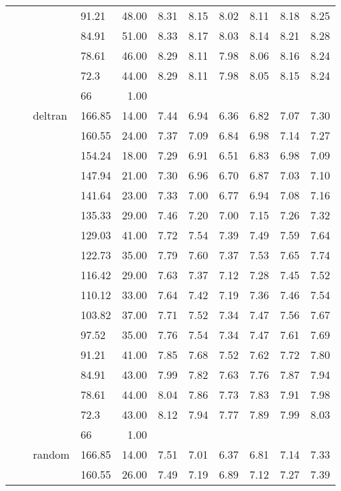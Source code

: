 \begin{longtable}{llllrrrrrrr}
   &  &  & 91.21 & 48.00 & 8.31 & 8.15 & 8.02 & 8.11 & 8.18 & 8.25 \\ 
   &  &  & 84.91 & 51.00 & 8.33 & 8.17 & 8.03 & 8.14 & 8.21 & 8.28 \\ 
   &  &  & 78.61 & 46.00 & 8.29 & 8.11 & 7.98 & 8.06 & 8.16 & 8.24 \\ 
   &  &  & 72.3 & 44.00 & 8.29 & 8.11 & 7.98 & 8.05 & 8.15 & 8.24 \\ 
   &  &  & 66 & 1.00 &  &  &  &  &  &  \\ 
   &  & deltran & 166.85 & 14.00 & 7.44 & 6.94 & 6.36 & 6.82 & 7.07 & 7.30 \\ 
   &  &  & 160.55 & 24.00 & 7.37 & 7.09 & 6.84 & 6.98 & 7.14 & 7.27 \\ 
   &  &  & 154.24 & 18.00 & 7.29 & 6.91 & 6.51 & 6.83 & 6.98 & 7.09 \\ 
   &  &  & 147.94 & 21.00 & 7.30 & 6.96 & 6.70 & 6.87 & 7.03 & 7.10 \\ 
   &  &  & 141.64 & 23.00 & 7.33 & 7.00 & 6.77 & 6.94 & 7.08 & 7.16 \\ 
   &  &  & 135.33 & 29.00 & 7.46 & 7.20 & 7.00 & 7.15 & 7.26 & 7.32 \\ 
   &  &  & 129.03 & 41.00 & 7.72 & 7.54 & 7.39 & 7.49 & 7.59 & 7.64 \\ 
   &  &  & 122.73 & 35.00 & 7.79 & 7.60 & 7.37 & 7.53 & 7.65 & 7.74 \\ 
   &  &  & 116.42 & 29.00 & 7.63 & 7.37 & 7.12 & 7.28 & 7.45 & 7.52 \\ 
   &  &  & 110.12 & 33.00 & 7.64 & 7.42 & 7.19 & 7.36 & 7.46 & 7.54 \\ 
   &  &  & 103.82 & 37.00 & 7.71 & 7.52 & 7.34 & 7.47 & 7.56 & 7.67 \\ 
   &  &  & 97.52 & 35.00 & 7.76 & 7.54 & 7.34 & 7.47 & 7.61 & 7.69 \\ 
   &  &  & 91.21 & 41.00 & 7.85 & 7.68 & 7.52 & 7.62 & 7.72 & 7.80 \\ 
   &  &  & 84.91 & 43.00 & 7.99 & 7.82 & 7.63 & 7.76 & 7.87 & 7.94 \\ 
   &  &  & 78.61 & 44.00 & 8.04 & 7.86 & 7.73 & 7.83 & 7.91 & 7.98 \\ 
   &  &  & 72.3 & 43.00 & 8.12 & 7.94 & 7.77 & 7.89 & 7.99 & 8.03 \\ 
   &  &  & 66 & 1.00 &  &  &  &  &  &  \\ 
   &  & random & 166.85 & 14.00 & 7.51 & 7.01 & 6.37 & 6.81 & 7.14 & 7.33 \\ 
   &  &  & 160.55 & 26.00 & 7.49 & 7.19 & 6.89 & 7.12 & 7.27 & 7.39 \\ 

\end{longtable}
